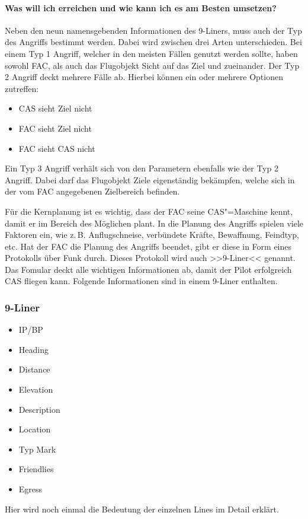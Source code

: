 \paragraph*{Was will ich erreichen und wie kann ich es am Besten umsetzen?}
	Neben den neun namensgebenden Informationen des 9-Liners, muss auch der Typ des
	Angriffs bestimmt werden. Dabei wird zwischen drei Arten unterschieden.
	Bei einem Typ 1 Angriff, welcher in den meisten Fällen genutzt werden sollte, haben
	sowohl FAC, als auch das Flugobjekt Sicht auf das Ziel und zueinander.
	Der Typ 2 Angriff deckt mehrere Fälle ab. Hierbei können ein oder mehrere Optionen
	zutreffen:
	\begin{itemize}
		\item CAS sieht Ziel nicht
		\item FAC sieht Ziel nicht
		\item FAC sieht CAS nicht
	\end{itemize}
	Ein Typ 3 Angriff verhält sich von den Parametern ebenfalls wie der Typ 2 Angriff. Dabei
	darf das Flugobjekt Ziele eigenständig bekämpfen, welche sich in der vom FAC
	angegebenen Zielbereich befinden.\par
	Für die Kernplanung ist es wichtig, dass der FAC seine CAS"=Maschine kennt, damit er im
	Bereich des Möglichen plant. In die Planung des Angriffs spielen viele Faktoren ein, wie
	z.\,B. Anflugschneise, verbündete Kräfte, Bewaffnung, Feindtyp, etc. Hat der FAC die
	Planung des Angriffs beendet, gibt er diese in Form eines Protokolls über Funk durch.
	Dieses Protokoll wird auch >>9-Liner<< genannt. Das Fomular deckt alle wichtigen
	Informationen ab, damit der Pilot erfolgreich CAS fliegen kann. Folgende Informationen
	sind in einem 9-Liner enthalten.

\subsubsection{9-Liner}
	\begin{itemize}
		\item IP/BP
		\item Heading
		\item Distance
		\item Elevation
		\item Description
		\item Location
		\item Typ Mark
		\item Friendlies
		\item Egress
	\end{itemize}
	Hier wird noch einmal die Bedeutung der einzelnen Lines im Detail erklärt.
